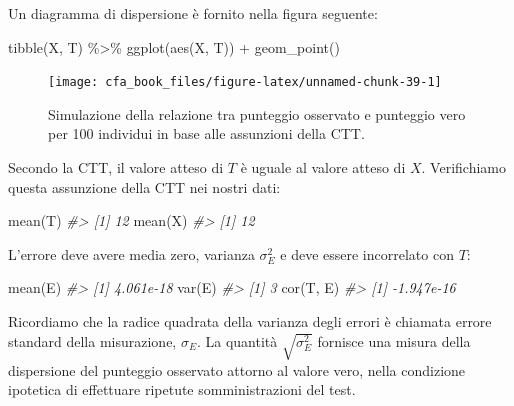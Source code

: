 \documentclass[
  11pt,
]{krantz}
\makeatletter
\newenvironment{Shaded}{\begin{snugshade}}{\end{snugshade}}
\newcommand{\CommentTok}[1]{\textcolor[rgb]{0.37,0.37,0.37}{\textit{#1}}}
\newcommand{\FunctionTok}[1]{\textcolor[rgb]{0,0,0}{#1}}
\newcommand{\NormalTok}[1]{#1}
\newcommand{\SpecialCharTok}[1]{\textcolor[rgb]{0,0,0}{#1}}
\newenvironment{kframe}{%
\medskip{}
\setlength{\fboxsep}{.8em}
 \def\at@end@of@kframe{}%
 \ifinner\ifhmode%
  \def\at@end@of@kframe{\end{minipage}}%
  \begin{minipage}{\columnwidth}%
 \fi\fi%
 \def\FrameCommand##1{\hskip\@totalleftmargin \hskip-\fboxsep
 \colorbox{shadecolor}{##1}\hskip-\fboxsep
     \hskip-\linewidth \hskip-\@totalleftmargin \hskip\columnwidth}%
 \MakeFramed {\advance\hsize-\width
   \@totalleftmargin\z@ \linewidth\hsize
   \@setminipage}}%
 {\par\unskip\endMakeFramed%
 \at@end@of@kframe}
\renewenvironment{Shaded}{\begin{kframe}}{\end{kframe}}
\theoremstyle{definition}
\theoremstyle{definition}
\theoremstyle{definition}
\theoremstyle{definition}
\theoremstyle{remark}
\makeatother
\begin{document}
Un diagramma di dispersione è fornito nella figura seguente:

\begin{Shaded}
\begin{Highlighting}[]
\FunctionTok{tibble}\NormalTok{(X, T) }\SpecialCharTok{\%\textgreater{}\%}
  \FunctionTok{ggplot}\NormalTok{(}\FunctionTok{aes}\NormalTok{(X, T)) }\SpecialCharTok{+}
  \FunctionTok{geom\_point}\NormalTok{()}
\end{Highlighting}
\end{Shaded}

\begin{figure}

{\centering \texttt{[image: cfa\_book\_files/figure-latex/unnamed-chunk-39-1]} 

}

\caption{Simulazione della relazione tra punteggio osservato e punteggio vero per 100 individui in base alle assunzioni della CTT.}\label{fig:unnamed-chunk-39}
\end{figure}

Secondo la CTT, il valore atteso di \(T\) è uguale al valore atteso di \(X\). Verifichiamo questa assunzione della CTT nei nostri dati:

\begin{Shaded}
\begin{Highlighting}[]
\FunctionTok{mean}\NormalTok{(T)}
\CommentTok{\#\textgreater{} [1] 12}
\FunctionTok{mean}\NormalTok{(X)}
\CommentTok{\#\textgreater{} [1] 12}
\end{Highlighting}
\end{Shaded}

L'errore deve avere media zero, varianza \(\sigma_E^2\) e deve essere incorrelato con \(T\):

\begin{Shaded}
\begin{Highlighting}[]
\FunctionTok{mean}\NormalTok{(E)}
\CommentTok{\#\textgreater{} [1] 4.061e{-}18}
\FunctionTok{var}\NormalTok{(E)}
\CommentTok{\#\textgreater{} [1] 3}
\FunctionTok{cor}\NormalTok{(T, E)}
\CommentTok{\#\textgreater{} [1] {-}1.947e{-}16}
\end{Highlighting}
\end{Shaded}

Ricordiamo che la radice quadrata della varianza degli errori è chiamata errore standard della misurazione, \(\sigma_E\). La quantità \(\sqrt{\sigma_E^2}\) fornisce una misura della dispersione del punteggio osservato attorno al valore vero, nella condizione ipotetica di effettuare ripetute somministrazioni del test.
\end{document}
